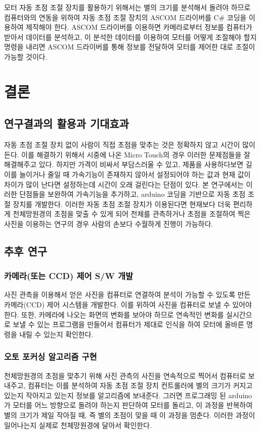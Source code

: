 \documentclass{abstract_hutech}
\begin{document}
모터 자동 초점 조절 장치를 활용하기 위해서는 별의 크기를 분석해서 돌려야 하므로 컴퓨터와의 연동을 위하여 자동 초점 조절 장치의 ASCOM 드라이버를 C\# 코딩을 이용하여 제작해야 한다. ASCOM 드라이버를 이용하면 카메라로부터 정보를 컴퓨터가 받아서 데이터를 분석하고, 이 분석한 데이터를 이용하여 모터를 어떻게 조절해야 할지 명령을 내리면 ASCOM 드라이버를 통해 정보를 전달하여 모터를 제어한 대로 조절이 가능할 것이다.

\section{결론}

\subsection{연구결과의 활용과 기대효과}

자동 초점 조절 장치 없이 사람이 직접 초점을 맞추는 것은 정확하지 않고 시간이 많이 든다. 이를 해결하기 위해서 시중에 나온 Micro Touch의 경우 이러한 문제점들을 잘 해결해주고 있다. 하지만 가격이 비싸서 부담스러울 수 있고, 제품을 사용하다보면 길이를 늘이거나 줄일 때 가속기능이 존재하지 않아서 설정되어야 하는 값과 현재 값이 차이가 많이 난다면 설정하는데 시간이 오래 걸린다는 단점이 있다. 본 연구에서는 이러한 단점들을 보완하여 가속기능을 추가하고, arduino 코딩을 기반으로 자동 초점 조절 장치를 개발한다. 이러한 자동 초점 조절 장치가 이용된다면 현재보다 더욱 편리하게 천체망원경의 초점을 맞출 수 있게 되어 천체를 관측하거나 초점을 조절하여 찍은 사진을 이용하는 연구의 경우 사람의 손보다 수월하게 진행이 가능하다.

\subsection{추후 연구}

\subsubsection{카메라(또는 CCD) 제어 S/W 개발}

사진 관측을 이용해서 얻은 사진을 컴퓨터로 연결하여 분석이 가능할 수 있도록 만든 카메라(CCD) 제어 시스템을 개발한다. 이를 위하여 사진을 컴퓨터로 보낼 수 있어야 한다. 또한, 카메라에 나오는 화면의 변화를 보아야 하므로 연속적인 변화를 실시간으로 보낼 수 있는 프로그램을 만들어서 컴퓨터가 제대로 인식을 하여 모터에 올바른 명령을 내릴 수 있는지 확인한다.

\subsubsection{오토 포커싱 알고리즘 구현}

천체망원경의 초점을 맞추기 위해 사진 관측의 사진을 연속적으로 찍어서 컴퓨터로 보내주고, 컴퓨터는 이를 분석하여 자동 초점 조절 장치 컨트롤러에 별의 크기가 커지고 있는지 작아지고 있는지 정보를 알고리즘에 보내준다. 그러면 프로그래밍 된 arduino가 모터를 어느 방향으로 돌려야 하는지 판단하여 모터를 돌리고, 이 과정을 반복하여 별의 크기가 제일 작아질 때, 즉 별의 초점이 맞을 때 이 과정을 멈춘다. 이러한 과정이 일어나는지 실제로 천체망원경에 달아서 확인한다.


\end{document}
